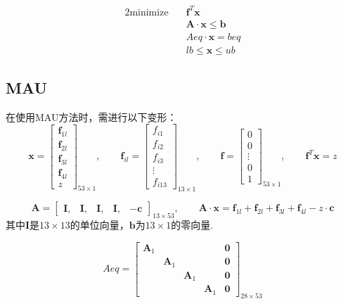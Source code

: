 \documentclass[UTF8]{ctexart}
\begin{document}
\begin{alignat}{2}
\mbox{minimize}\quad &\bm{f}^T\bm{x} \nonumber\\
&\bm{A}\cdot\bm{x}\leq\bm{b}\nonumber\\
&Aeq\cdot\bm{x}=beq\nonumber\\
&lb\leq \bm{x}\leq ub
\end{alignat}

\newpage
\subsection{MAU}
在使用MAU方法时，需进行以下变形：
\[\bm{x}=\begin{bmatrix}
\bm{f}_{1l}\\\bm{f}_{2l}\\\bm{f}_{3l}\\\bm{f}_{4l}\\z
\end{bmatrix}_{53\times 1},\qquad
\bm{f}_{il}=\begin{bmatrix}
f_{i1}\\f_{i2}\\f_{i3}\\ \vdots\\ f_{i13}
\end{bmatrix}_{13\times 1},\qquad
\bm{f}=\begin{bmatrix}
0\\0\\ \vdots\\0\\ 1
\end{bmatrix}_{53\times 1},\qquad
\bm{f}^T\bm{x}=z\]

\[\bm{A}=\begin{bmatrix}
\bm{I},&\bm{I},&\bm{I},&\bm{I},&-\bm{c}
\end{bmatrix}_{13\times 53},\qquad
\bm{A}\cdot\bm{x}=\bm{f}_{1l}+\bm{f}_{2l}+\bm{f}_{3l}+\bm{f}_{4l}-z\cdot \bm{c}
\]
其中$\bm{I}$是$13\times 13$的单位向量，$\bm{b}$为$13\times 1$的零向量.

\[Aeq=\begin{bmatrix}
\bm{A}_1&{}&{}&{}&\bm{0}\\
{}&\bm{A}_1&{}&{}&\bm{0}\\
{}&{}&\bm{A}_1&{}&\bm{0}\\
{}&{}&{}&\bm{A}_1&\bm{0}
\end{bmatrix}_{28\times 53}\]
\end{document}
